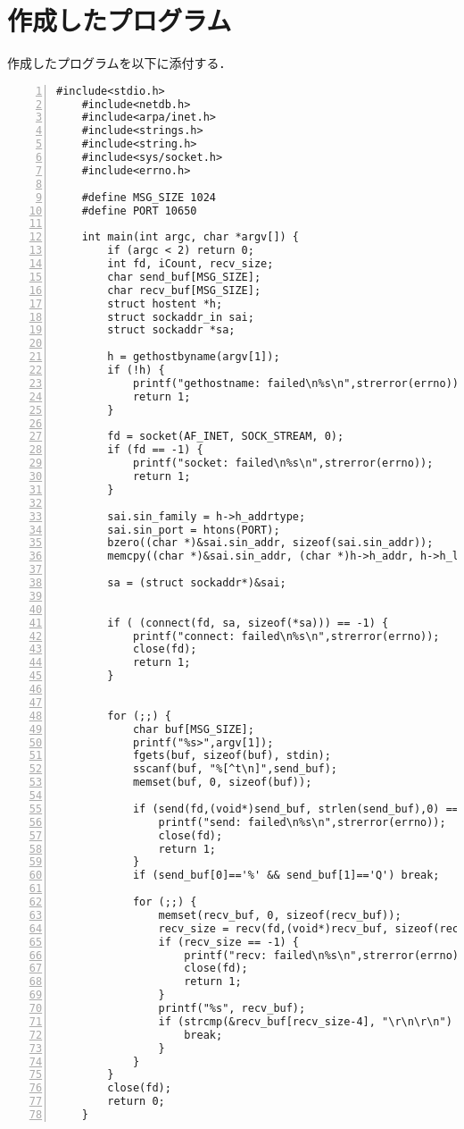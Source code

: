\documentclass[11pt]{jarticle}
\begin{document}
\section{作成したプログラム} \label{sec:program}

作成したプログラムを以下に添付する．

\begin{lstlisting}[caption=クライアント側プログラム,label=client,numbers=left]
    #include<stdio.h>
    #include<netdb.h>
    #include<arpa/inet.h>
    #include<strings.h>
    #include<string.h>
    #include<sys/socket.h>
    #include<errno.h>

    #define MSG_SIZE 1024
    #define PORT 10650

    int main(int argc, char *argv[]) {
        if (argc < 2) return 0;
        int fd, iCount, recv_size;
        char send_buf[MSG_SIZE];
        char recv_buf[MSG_SIZE];
        struct hostent *h;
        struct sockaddr_in sai;
        struct sockaddr *sa;

        h = gethostbyname(argv[1]);
        if (!h) {
            printf("gethostname: failed\n%s\n",strerror(errno));
            return 1;
        }

        fd = socket(AF_INET, SOCK_STREAM, 0);
        if (fd == -1) {
            printf("socket: failed\n%s\n",strerror(errno));
            return 1;
        }

        sai.sin_family = h->h_addrtype;
        sai.sin_port = htons(PORT);
        bzero((char *)&sai.sin_addr, sizeof(sai.sin_addr));
        memcpy((char *)&sai.sin_addr, (char *)h->h_addr, h->h_length);
            
        sa = (struct sockaddr*)&sai;
        

        if ( (connect(fd, sa, sizeof(*sa))) == -1) {
            printf("connect: failed\n%s\n",strerror(errno));
            close(fd);
            return 1;
        }


        for (;;) {
            char buf[MSG_SIZE];
            printf("%s>",argv[1]);
            fgets(buf, sizeof(buf), stdin);
            sscanf(buf, "%[^t\n]",send_buf);
            memset(buf, 0, sizeof(buf));
            
            if (send(fd,(void*)send_buf, strlen(send_buf),0) == -1) {
                printf("send: failed\n%s\n",strerror(errno));
                close(fd);
                return 1;
            }
            if (send_buf[0]=='%' && send_buf[1]=='Q') break;

            for (;;) {
                memset(recv_buf, 0, sizeof(recv_buf));
                recv_size = recv(fd,(void*)recv_buf, sizeof(recv_buf), 0);
                if (recv_size == -1) {
                    printf("recv: failed\n%s\n",strerror(errno));
                    close(fd);
                    return 1;
                }
                printf("%s", recv_buf);
                if (strcmp(&recv_buf[recv_size-4], "\r\n\r\n") == 0) {
                    break;
                }
            }
        }    
        close(fd);
        return 0;
    }

\end{lstlisting}
\end{document}
